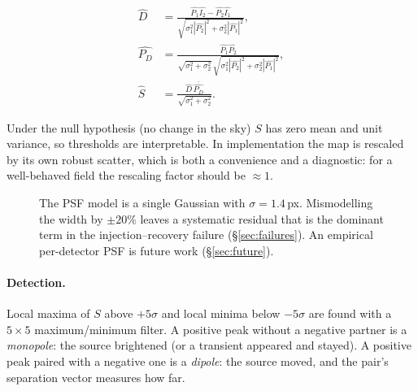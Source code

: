 \documentclass[11pt,a4paper]{article}
\begin{document}
\begin{align}
  \widehat{D} &= \frac{\widehat{P_1}\widehat{I_2} - \widehat{P_2}\widehat{I_1}}
                       {\sqrt{\sigma_1^2|\widehat{P_2}|^2 + \sigma_2^2|\widehat{P_1}|^2}},
  \label{eq:zogy-d}\\[2pt]
  \widehat{P_D} &= \frac{\widehat{P_1}\widehat{P_2}}
                        {\sqrt{\sigma_1^2+\sigma_2^2}\,\sqrt{\sigma_1^2|\widehat{P_2}|^2 + \sigma_2^2|\widehat{P_1}|^2}},
  \label{eq:zogy-pd}\\[2pt]
  \widehat{S} &= \frac{\widehat{D}\,\overline{\widehat{P_D}}}
                      {\sqrt{\sigma_1^2+\sigma_2^2}}.
  \label{eq:zogy-s}
\end{align}

Under the null hypothesis (no change in the sky) $S$ has zero mean and unit variance, so thresholds
are interpretable. In implementation the map is rescaled by its own robust scatter, which is both a
convenience and a diagnostic: for a well-behaved field the rescaling factor should be $\approx 1$.

\begin{figure}[H]
\centering
{}
\caption{The PSF model is a single Gaussian with $\sigma=1.4$\,px. Mismodelling the width by $\pm20\%$
leaves a systematic residual that is the dominant term in the injection--recovery failure
(\S\ref{sec:failures}). An empirical per-detector PSF is future work (\S\ref{sec:future}).}
\label{fig:psf}
\end{figure}

\paragraph{Detection.} Local maxima of $S$ above $+5\sigma$ and local minima below $-5\sigma$ are
found with a $5\times5$ maximum/minimum filter. A positive peak without a negative partner is a
\emph{monopole}: the source brightened (or a transient appeared and stayed). A positive peak paired
with a negative one is a \emph{dipole}: the source moved, and the pair's separation vector measures
how far.
\end{document}
